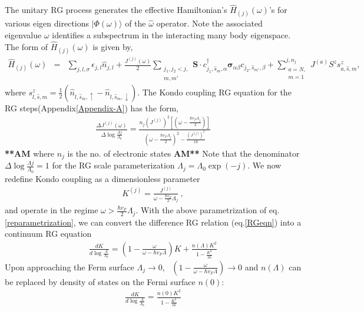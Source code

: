 \documentclass[aps,prl,preprint,groupedaddress]{revtex4-2}
\begin{document}
The unitary RG process generates the effective Hamiltonian's $\hat{H}_{(j)}(\omega)$'s for various eigen directions $|\Phi(\omega)\rangle$
of the $\hat{\omega}$ operator. Note the associated eigenvalue $\omega$ identifies a subspectrum in the interacting many body eigenspace. The form of $\hat{H}_{(j)}(\omega)$ is given by,
\begin{eqnarray}
\hat{H}_{(j)}(\omega) &=& \sum_{j,l,\sigma}\epsilon_{j,l}\hat{n}_{j,l}+\frac{J^{(j)}(\omega)}{2}\sum_{\substack{j_{1},j_{2}<j,\\ m,m'}}\mathbf{S}\cdot c^{\dagger}_{j_{1},\hat{s}_{m},\alpha}\boldsymbol{\sigma}_{\alpha\beta}c_{j_{2},\hat{s}_{m'},\beta}+\sum^{j,n_{j}}_{\substack{a=N,\\ m=1}}J^{(a)}S^{z}s^{z}_{a,\hat{s},m},
\end{eqnarray}
where  $s^{z}_{l,\hat{s},m}=\frac{1}{2}(\hat{n}_{l,\hat{s}_{m},\uparrow}-\hat{n}_{l,\hat{s}_{m},\downarrow})$. The Kondo coupling RG equation for the RG steps(Appendix\ref{Appendix-A}) has the form,
\begin{eqnarray}
\frac{\Delta J^{(j)}(\omega)}{\Delta\log\frac{\Lambda{j}}{\Lambda_{0}}}=\frac{n_{j}(J^{(j)})^{2}\left[(\omega - \frac{\hbar v_{F}\Lambda_{j}}{2})\right]}{(\omega - \frac{\hbar v_{F}\Lambda_{j}}{2})^{2}-\frac{\left(J^{(j)}\right)^{2}}{16}}\label{RGeqn}
\end{eqnarray}
\textbf{**AM} where $n_{j}$ is the no. of electronic states \textbf{AM**}
Note that the denominator $\Delta\log\frac{\Lambda{j}}{\Lambda_{0}} =1$ for the RG scale parameterization $\Lambda_{j}=\Lambda_{0}\exp(-j)$. We now redefine Kondo coupling as a dimensionless parameter
\begin{eqnarray}
K^{(j)}=\frac{J^{(j)}}{\omega-\frac{\hbar v_{F}}{2}\Lambda_{j}}~,\label{reparametrization}
\end{eqnarray} 
and operate in the regime $\omega>\frac{\hbar v_{F}}{2}\Lambda_{j}$. 
With the above parametrization of eq.\eqref{reparametrization}, we can convert the difference RG relation (eq.\eqref{RGeqn}) into a continuum RG equation
\begin{eqnarray}
\frac{d K}{d\log\frac{\Lambda}{\Lambda_{0}}}=\left(1-\frac{\omega}{\omega-\hbar v_{F}\Lambda}\right)K+\frac{n(\Lambda)K^{2}}{1-\frac{K^{2}}{16}}
\end{eqnarray}
Upon approaching the Ferm surface $\Lambda_{j}\to 0$,~ $\left(1-\frac{\omega}{\omega-\hbar v_{F}\Lambda}\right)\to 0$ and $n(\Lambda)$ can be replaced by density of states on the Fermi surface $n(0)$:
\begin{eqnarray}
\frac{d K}{d\log\frac{\Lambda}{\Lambda_{0}}}=\frac{n(0)K^{2}}{1-\frac{K^{2}}{16}}
\end{eqnarray}
\end{document}
